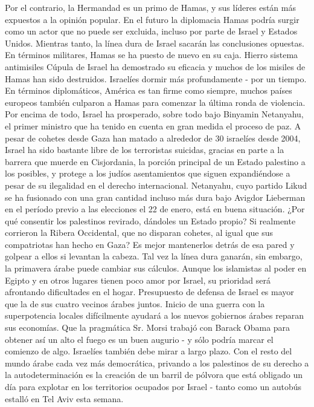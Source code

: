 Por el contrario, la Hermandad es un primo de Hamas, y sus líderes están más expuestos a la opinión popular.
En el futuro la diplomacia Hamas podría surgir como un actor que no puede ser excluida, incluso por parte de Israel y Estados Unidos.
Mientras tanto, la línea dura de Israel sacarán las conclusiones opuestas.
En términos militares, Hamas se ha puesto de nuevo en su caja.
Hierro sistema antimisiles Cúpula de Israel ha demostrado su eficacia y muchos de los misiles de Hamas han sido destruidos.
Israelíes dormir más profundamente - por un tiempo.
En términos diplomáticos, América es tan firme como siempre, muchos países europeos también culparon a Hamas para comenzar la última ronda de violencia.
Por encima de todo, Israel ha prosperado, sobre todo bajo Binyamin Netanyahu, el primer ministro que ha tenido en cuenta en gran medida el proceso de paz.
A pesar de cohetes desde Gaza han matado a alrededor de 30 israelíes desde 2004, Israel ha sido bastante libre de los terroristas suicidas, gracias en parte a la barrera que muerde en Cisjordania, la porción principal de un Estado palestino a los posibles, y protege a los judíos asentamientos que siguen expandiéndose a pesar de su ilegalidad en el derecho internacional.
Netanyahu, cuyo partido Likud se ha fusionado con una gran cantidad incluso más dura bajo Avigdor Lieberman en el período previo a las elecciones el 22 de enero, está en buena situación.
¿Por qué consentir los palestinos revirado, dándoles un Estado propio?
Si realmente corrieron la Ribera Occidental, que no disparan cohetes, al igual que sus compatriotas han hecho en Gaza?
Es mejor mantenerlos detrás de esa pared y golpear a ellos si levantan la cabeza.
Tal vez la línea dura ganarán, sin embargo, la primavera árabe puede cambiar sus cálculos.
Aunque los islamistas al poder en Egipto y en otros lugares tienen poco amor por Israel, su prioridad será afrontando dificultades en el hogar.
Presupuesto de defensa de Israel es mayor que la de sus cuatro vecinos árabes juntos.
Inicio de una guerra con la superpotencia locales difícilmente ayudará a los nuevos gobiernos árabes reparan sus economías.
Que la pragmática Sr. Morsi trabajó con Barack Obama para obtener así un alto el fuego es un buen augurio - y sólo podría marcar el comienzo de algo.
Israelíes también debe mirar a largo plazo.
Con el resto del mundo árabe cada vez más democrática, privando a los palestinos de su derecho a la autodeterminación es la creación de un barril de pólvora que está obligado un día para explotar en los territorios ocupados por Israel - tanto como un autobús estalló en Tel Aviv esta semana.
